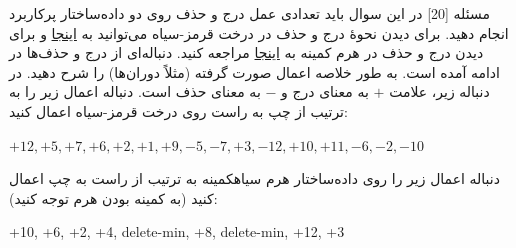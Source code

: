 ‌مسئله [20]
در این سوال باید تعدادی عمل درج و حذف روی دو داده‌ساختار پرکاربرد انجام دهید.
برای دیدن نحوۀ درج و حذف در درخت قرمز-سیاه می‌توانید به 
\href{https://www.cs.usfca.edu/~galles/visualization/RedBlack.html}{اینجا}
و برای دیدن درج و حذف در هرم کمینه به
\href{https://www.cs.usfca.edu/~galles/visualization/Heap.html}{اینجا}
مراجعه کنید. دنباله‌ای از درج و حذف‌ها در ادامه آمده است. به طور خلاصه اعمال صورت گرفته (مثلاً دوران‌ها) را شرح دهید.
در دنباله زیر، علامت $+$ به معنای درج و $-$ به معنای حذف است. دنباله اعمال زیر را به ترتیب از چپ به راست  روی درخت قرمز-سیاه اعمال کنید:

\begin{latin}
	$+12, +5, +7, +6, +2, +1, +9, -5, -7, +3, -12, +10, +11, -6, -2, -10$
\end{latin}

دنباله اعمال زیر را روی داده‌ساختار هرم ‌سیاه{کمینه} به ترتیب از راست به چپ اعمال کنید (به کمینه بودن هرم توجه کنید):
\begin{latin}
+10, +6, +2, +4, delete-min, +8, delete-min, +12, +3
\end{latin}












